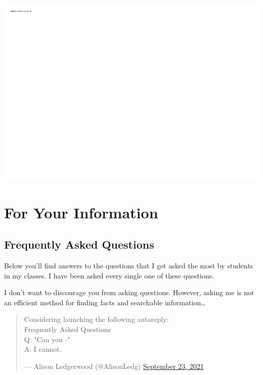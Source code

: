 \includegraphics{0204_datascience_files/figure-latex/unnamed-chunk-3-1.pdf}

\hypertarget{part-for-your-information}{%
\part*{For Your Information}\label{part-for-your-information}}


\hypertarget{frequently-asked-questions}{%
\chapter{Frequently Asked Questions}\label{frequently-asked-questions}}

Below you'll find answers to the questions that I get asked the most by students in my classes. I have been asked every single one of these questions.

I don't want to discourage you from asking questions. However, asking me is not an efficient method for finding facts and searchable information\ldots{}

\begin{quote}
Considering launching the following autoreply:\\
Frequently Asked Questions\\
Q: "Can you -"\\
A: I cannot.

\begin{flushright}--- Alison Ledgerwood (@AlisonLedg) \href{https://twitter.com/AlisonLedg/status/1441181845706579969}{September 23,
2021}\end{flushright}
\end{quote}

